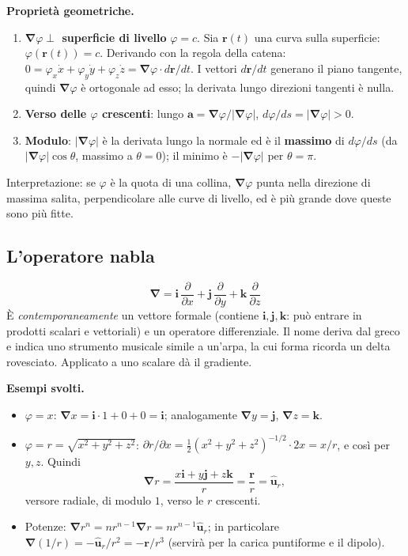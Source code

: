 \documentclass[11pt,a4paper]{article}
\newcommand{\vv}[1]{\mathbf{#1}}
\newcommand{\ur}{\hat{\mathbf{u}}_r}
\newcommand{\pd}[2]{\dfrac{\partial #1}{\partial #2}}
\newcommand{\mo}[1]{\left|#1\right|}
\newcommand{\nab}{\boldsymbol{\nabla}}
\begin{document}
\textbf{Proprietà geometriche.}
\begin{enumerate}[nosep]
\item \textbf{$\nab\varphi\perp$ superficie di livello} $\varphi=c$. Sia $\vv r(t)$ una curva sulla superficie: $\varphi(\vv r(t))=c$. Derivando con la regola della catena: $0=\varphi_x\dot x+\varphi_y\dot y+\varphi_z\dot z=\nab\varphi\cdot d\vv r/dt$. I vettori $d\vv r/dt$ generano il piano tangente, quindi $\nab\varphi$ è ortogonale ad esso; la derivata lungo direzioni tangenti è nulla.
\item \textbf{Verso delle $\varphi$ crescenti}: lungo $\vv a=\nab\varphi/\mo{\nab\varphi}$, $d\varphi/ds=\mo{\nab\varphi}>0$.
\item \textbf{Modulo}: $\mo{\nab\varphi}$ è la derivata lungo la normale ed è il \textbf{massimo} di $d\varphi/ds$ (da $\mo{\nab\varphi}\cos\theta$, massimo a $\theta=0$); il minimo è $-\mo{\nab\varphi}$ per $\theta=\pi$.
\end{enumerate}
Interpretazione: se $\varphi$ è la quota di una collina, $\nab\varphi$ punta nella direzione di massima salita, perpendicolare alle curve di livello, ed è più grande dove queste sono più fitte.

\subsection{L'operatore nabla}\label{sec:nabla}
\begin{equation}
\nab=\vv i\,\pd{}x+\vv j\,\pd{}y+\vv k\,\pd{}z
\end{equation}
È \emph{contemporaneamente} un vettore formale (contiene $\vv i,\vv j,\vv k$: può entrare in prodotti scalari e vettoriali) e un operatore differenziale. Il nome deriva dal greco e indica uno strumento musicale simile a un'arpa, la cui forma ricorda un delta rovesciato. Applicato a uno scalare dà il gradiente.

\textbf{Esempi svolti.}
\begin{itemize}[nosep]
\item $\varphi=x$: $\nab x=\vv i\cdot1+0+0=\vv i$; analogamente $\nab y=\vv j$, $\nab z=\vv k$.
\item $\varphi=r=\sqrt{x^2+y^2+z^2}$: $\partial r/\partial x=\tfrac12(x^2+y^2+z^2)^{-1/2}\cdot2x=x/r$, e così per $y,z$. Quindi
\[
\nab r=\frac{x\vv i+y\vv j+z\vv k}{r}=\frac{\vv r}{r}=\ur,
\]
versore radiale, di modulo $1$, verso le $r$ crescenti.
\item Potenze: $\nab r^n=nr^{n-1}\nab r=nr^{n-1}\ur$; in particolare $\nab(1/r)=-\ur/r^2=-\vv r/r^3$ (servirà per la carica puntiforme e il dipolo).
\end{itemize}
\end{document}
